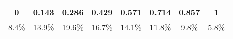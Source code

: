 
\begin{tabular}{c|c|c|c|c|c|c|c}
\hline
0 & 0.143 & 0.286 & 0.429 & 0.571 & 0.714 & 0.857 & 1\\
\hline
8.4\% & 13.9\% & 19.6\% & 16.7\% & 14.1\% & 11.8\% & 9.8\% & 5.8\%\\
\hline
\end{tabular}
